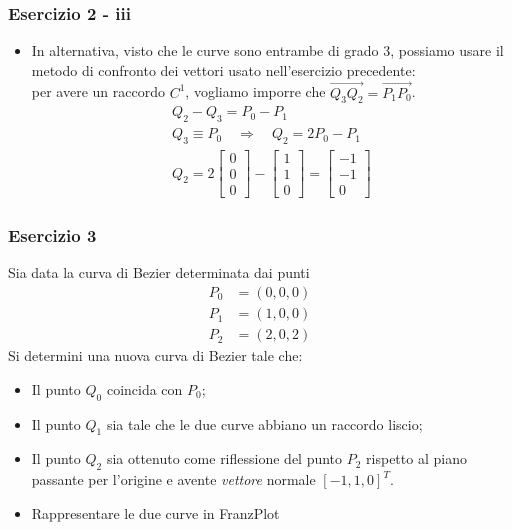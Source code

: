 \documentclass{beamer}
\newcommand{\frnzplt}{FranzPlot }
\begin{document}
\begin{frame}
	\frametitle{Esercizio 2 - iii}
	\begin{itemize} 
		\item In alternativa, visto che le curve sono entrambe di grado 3, possiamo usare il metodo di confronto dei vettori usato nell'esercizio precedente: \\
                    per avere un raccordo $C^1$, vogliamo imporre che $\overrightarrow {Q_3 Q_2} = \overrightarrow{P_1 P_0}$.
                    \begin{gather*}
                        Q_2 - Q_3 = P_0 - P_1 \\
                        Q_3 \equiv P_0 \quad \Rightarrow \quad Q_2 = 2P_0 - P_1 \\
                        Q_2 = 2 \begin{bmatrix} 0 \\ 0 \\ 0 \end{bmatrix} - \begin{bmatrix} 1 \\ 1 \\ 0 \end{bmatrix} = \begin{bmatrix} -1 \\ -1 \\ 0 \end{bmatrix}
                    \end{gather*}
	\end{itemize}
\end{frame}

\begin{frame}
\frametitle{Esercizio 3}
Sia data la curva di Bezier determinata dai punti
\begin{align*}
P_0 &= (0,0,0 ) \\
P_1 &= (1,0,0 ) \\
P_2 &= (2,0,2 )
\end{align*}
Si determini una nuova curva di Bezier tale che:
\begin{itemize}
\item Il punto $Q_0$ coincida con $P_0$;
\item Il punto $Q_1$ sia tale che le due curve abbiano un raccordo liscio;
\item Il punto $Q_2$ sia ottenuto come riflessione del punto $P_2$ rispetto al piano
    passante per l'origine e avente \textit{vettore} normale $[-1, 1, 0]^T$.
\item Rappresentare le due curve in \frnzplt
\end{itemize}
\end{frame}
\end{document}
